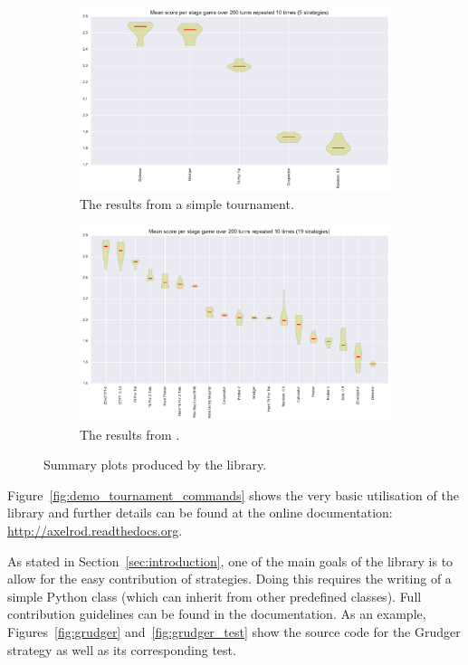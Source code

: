 \documentclass{article}
\begin{document}
\begin{figure}[!hbtp]
	\begin{subfigure}{.5\textwidth}
		\centering
		\includegraphics[width=\textwidth]{../img/demo_tournament.pdf}
		\caption{The results from a simple tournament.}
		\label{fig:demo_tournament}
	\end{subfigure}
	\begin{subfigure}{.5\textwidth}
		\centering
		\includegraphics[width=\textwidth]{../img/stewart_tournament.pdf}
		\caption{The results from \cite{Stewart2012}.}
		\label{fig:stewart_tournament}
	\end{subfigure}
	\caption{Summary plots produced by the library.}
\end{figure}

Figure~\ref{fig:demo_tournament_commands} shows the very basic utilisation
of the library and further details can be found at the online documentation:
\url{http://axelrod.readthedocs.org}.

As stated in Section~\ref{sec:introduction}, one of the main goals of the library
is to allow for the easy contribution of strategies. Doing this requires the
writing of a simple Python class (which can inherit from other predefined
classes). Full contribution guidelines can be found in the documentation.
As an example, Figures~\ref{fig:grudger} and~\ref{fig:grudger_test} show the source code for
the Grudger strategy as well as its corresponding test.
\end{document}
